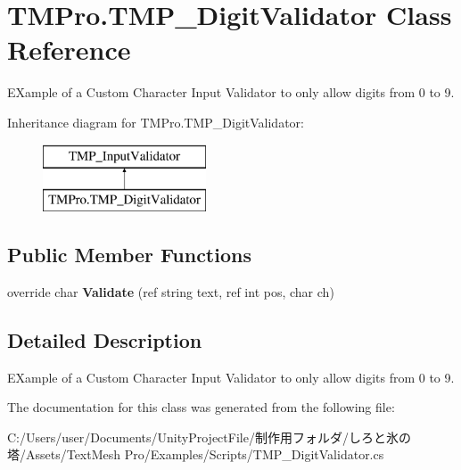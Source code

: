 \hypertarget{class_t_m_pro_1_1_t_m_p___digit_validator}{}\section{T\+M\+Pro.\+T\+M\+P\+\_\+\+Digit\+Validator Class Reference}
\label{class_t_m_pro_1_1_t_m_p___digit_validator}


E\+Xample of a Custom Character Input Validator to only allow digits from 0 to 9.  


Inheritance diagram for T\+M\+Pro.\+T\+M\+P\+\_\+\+Digit\+Validator\+:\begin{figure}[H]
\begin{center}
\leavevmode
\includegraphics[height=2.000000cm]{class_t_m_pro_1_1_t_m_p___digit_validator}
\end{center}
\end{figure}
\subsection*{Public Member Functions}
\begin{DoxyCompactItemize}
\item 
\mbox{\label{class_t_m_pro_1_1_t_m_p___digit_validator_aee9e46839d4adef308831e5fcba40b0e}} 
override char {\bfseries Validate} (ref string text, ref int pos, char ch)
\end{DoxyCompactItemize}


\subsection{Detailed Description}
E\+Xample of a Custom Character Input Validator to only allow digits from 0 to 9. 



The documentation for this class was generated from the following file\+:\begin{DoxyCompactItemize}
\item 
C\+:/\+Users/user/\+Documents/\+Unity\+Project\+File/制作用フォルダ/しろと氷の塔/\+Assets/\+Text\+Mesh Pro/\+Examples/\+Scripts/T\+M\+P\+\_\+\+Digit\+Validator.\+cs\end{DoxyCompactItemize}
